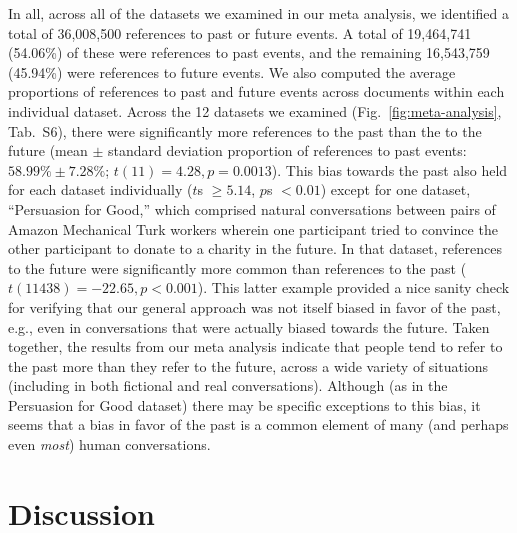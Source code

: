 \documentclass[10pt]{article}
\newcommand{\metaAnalysisDatasets}{S6}
\begin{document}
In all, across all of the datasets we examined in our meta analysis, we identified a total of 36,008,500 references to past or future events. A total of 19,464,741 (54.06\%) of these were references to past events, and the remaining 16,543,759 (45.94\%) were references to future events. We also computed the average proportions of references to past and future events across documents within each individual dataset. Across the 12 datasets we examined (Fig.~\ref{fig:meta-analysis}, Tab.~\metaAnalysisDatasets), there were significantly more references to the past than the to the future (mean $\pm$ standard deviation proportion of references to past events: $58.99\% \pm 7.28\%$; $t(11) = 4.28, p = 0.0013$). This bias towards the past also held for each dataset individually ($t$s $\geq 5.14$, $p$s $< 0.01$) except for one dataset, ``Persuasion for Good,'' which comprised natural conversations between pairs of Amazon Mechanical Turk workers wherein one participant tried to convince the other participant to donate to a charity in the future. In that dataset, references to the future were significantly more common than references to the past ($t(11438) = -22.65, p < 0.001$). This latter example provided a nice sanity check for verifying that our general approach was not itself biased in favor of the past, e.g., even in conversations that were actually biased towards the future. Taken together, the results from our meta analysis indicate that people tend to refer to the past more than they refer to the future, across a wide variety of situations (including in both fictional and real conversations). Although (as in the Persuasion for Good dataset) there may be specific exceptions to this bias, it seems that a bias in favor of the past is a common element of many (and perhaps even \textit{most}) human conversations.

\section*{Discussion}
\end{document}
